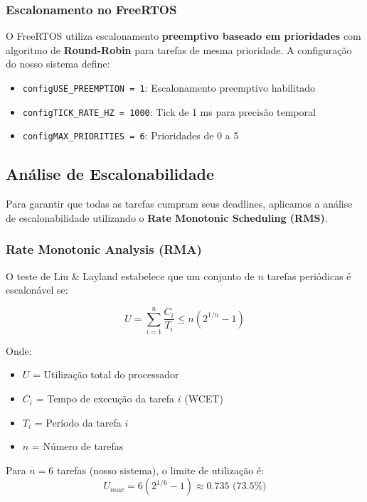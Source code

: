 \documentclass[12pt,a4paper]{article}
\begin{document}
\subsubsection{Escalonamento no FreeRTOS}

O FreeRTOS utiliza escalonamento \textbf{preemptivo baseado em prioridades} com algoritmo de \textbf{Round-Robin} para tarefas de mesma prioridade. A configuração do nosso sistema define:

\begin{itemize}
    \item \texttt{configUSE\_PREEMPTION = 1}: Escalonamento preemptivo habilitado
    \item \texttt{configTICK\_RATE\_HZ = 1000}: Tick de 1 ms para precisão temporal
    \item \texttt{configMAX\_PRIORITIES = 6}: Prioridades de 0 a 5
\end{itemize}

\subsection{Análise de Escalonabilidade}

Para garantir que todas as tarefas cumpram seus deadlines, aplicamos a análise de escalonabilidade utilizando o \textbf{Rate Monotonic Scheduling (RMS)}.

\subsubsection{Rate Monotonic Analysis (RMA)}

O teste de Liu \& Layland estabelece que um conjunto de $n$ tarefas periódicas é escalonável se:

\begin{equation}
U = \sum_{i=1}^{n} \frac{C_i}{T_i} \leq n(2^{1/n} - 1)
\end{equation}

Onde:
\begin{itemize}
    \item $U$ = Utilização total do processador
    \item $C_i$ = Tempo de execução da tarefa $i$ (WCET)
    \item $T_i$ = Período da tarefa $i$
    \item $n$ = Número de tarefas
\end{itemize}

Para $n = 6$ tarefas (nosso sistema), o limite de utilização é:
\begin{equation}
U_{max} = 6(2^{1/6} - 1) \approx 0.735 \text{ (73.5\%)}
\end{equation}
\end{document}
